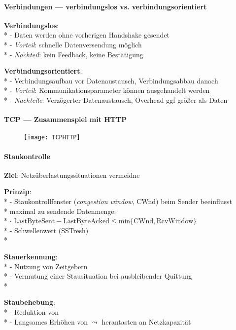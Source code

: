 \paragraph{Verbindungen --- verbindungslos vs. verbindungsorientiert}
\begin{items}
  \item \textbf{Verbindungslos}: \\*
    - Daten werden ohne vorherigen Handshake gesendet \\*
    - \emph{Vorteil}: schnelle Datenversendung möglich \\*
    - \emph{Nachteil}: kein Feedback, keine Bestätigung
  \item \textbf{Verbindungsorientiert}: \\*
    - Verbindungsaufbau vor Datenaustausch, Verbindungsabbau danach \\*
    - \emph{Vorteil}: Kommunikationsparameter können ausgehandelt werden \\*
    - \emph{Nachteile}: Verzögerter Datenaustausch, Overhead ggf größer als Daten
\end{items}

\paragraph{TCP --- Zusammenspiel mit HTTP}
\begin{figure}[H]\centering\label{TCPHTTP}\texttt{[image: TCPHTTP]}\end{figure}

\paragraph{Staukontrolle}
\begin{items}
  \item \textbf{Ziel}: Netzüberlastungssituationen vermeidne
  \item \textbf{Prinzip}: \\*
    - Staukontrollfenster (\emph{congestion window}, CWnd) beim Sender beeinflusst \\* \phantom{-} \phantom{\( \cdot \)} maximal zu sendende Datenmenge: \\* \phantom{-} \( \cdot \) \( \text{LastByteSent} - \text{LastByteAcked} \leq \text{min} \{ \text{CWnd}, \text{RcvWindow} \} \) \\*
    - Schwellenwert (SSTresh) \\*
  \item \textbf{Stauerkennung}: \\*
    - Nutzung von Zeitgebern \\*
    - Vermutung einer Stausituation bei ausbleibender Quittung \\*
  \item \textbf{Staubehebung}: \\*
    - Reduktion von  \\*
    - Langsames Erhöhen von  \( \leadsto \) herantasten an Netzkapazität
\end{items}

